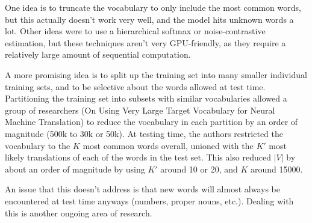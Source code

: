 One idea is to truncate the vocabulary to only include the most common words, but this actually doesn't work very well, and the model hits unknown words a lot. Other ideas were to use a hierarchical softmax or noise-contrastive estimation, but these techniques aren't very GPU-friendly, as they require a relatively large amount of sequential computation.

A more promising idea is to split up the training set into many smaller individual training sets, and to be selective about the words allowed at test time. Partitioning the training set into subsets with similar vocabularies allowed a group of researchers (On Using Very Large Target Vocabulary for Neural Machine Translation) to reduce the vocabulary in each partition by an order of magnitude (500k to 30k or 50k). At testing time, the authors restricted the vocabulary to the $K$ most common words overall, unioned with the $K'$ most likely translations of each of the words in the test set. This also reduced $|V|$ by about an order of magnitude by using $K'$ around 10 or 20, and $K$ around 15000.

An issue that this doesn't address is that new words will almost always be encountered at test time anyways (numbers, proper nouns, etc.). Dealing with this is another ongoing area of research.
